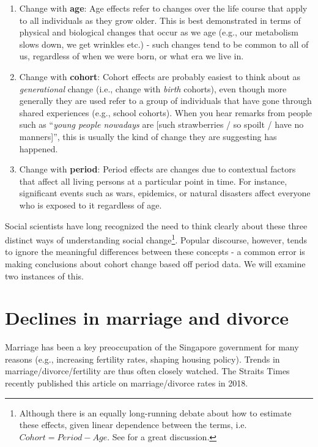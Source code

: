 \documentclass[
  openany]{book}
\begin{document}
\begin{enumerate}
\def\labelenumi{\arabic{enumi}.}
\item
  Change with \textbf{age}: Age effects refer to changes over the life course that apply to all individuals as they grow older. This is best demonstrated in terms of physical and biological changes that occur as we age (e.g., our metabolism slows down, we get wrinkles etc.) - such changes tend to be common to all of us, regardless of when we were born, or what era we live in.
\item
  Change with \textbf{cohort}: Cohort effects are probably easiest to think about as \emph{generational} change (i.e., change with \emph{birth} cohorts), even though more generally they are used refer to a group of individuals that have gone through shared experiences (e.g., school cohorts). When you hear remarks from people such as ``\emph{young people nowadays} are {[}such strawberries / so spoilt / have no manners{]}'', this is usually the kind of change they are suggesting has happened.
\item
  Change with \textbf{period}: Period effects are changes due to contextual factors that affect all living persons at a particular point in time. For instance, significant events such as wars, epidemics, or natural disasters affect everyone who is exposed to it regardless of age.
\end{enumerate}

Social scientists have long recognized the need to think clearly about these three distinct ways of understanding social change\footnote{Although there is an equally long-running debate about how to estimate these effects, given linear dependence between the terms, i.e.~\(Cohort = Period - Age\). See \citet{fosse_analyzing_2019} for a great discussion.}. Popular discourse, however, tends to ignore the meaningful differences between these concepts - a common error is making conclusions about cohort change based off period data. We will examine two instances of this.

\hypertarget{marriage-decline}{%
\section{Declines in marriage and divorce}\label{marriage-decline}}

Marriage has been a key preoccupation of the Singapore government for many reasons (e.g., increasing fertility rates, shaping housing policy). Trends in marriage/divorce/fertility are thus often closely watched. The Straits Times recently published this article on marriage/divorce rates in 2018.
\end{document}
